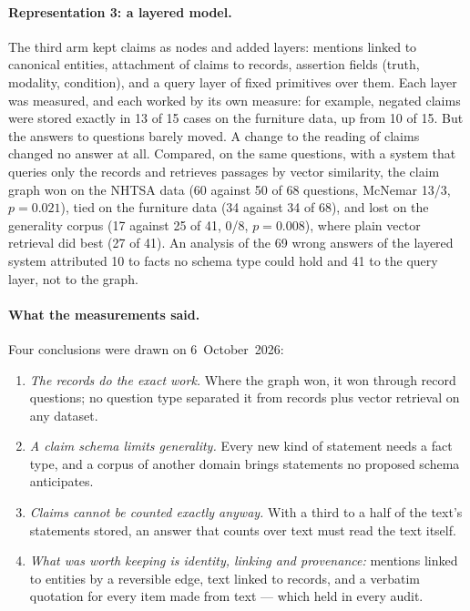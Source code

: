 \paragraph{Representation 3: a layered model.} The third arm kept claims as nodes and added layers: mentions
linked to canonical entities, attachment of claims to records, assertion fields (truth, modality, condition), and
a query layer of fixed primitives over them. Each layer was measured, and each worked by its own measure: for
example, negated claims were stored exactly in 13 of 15 cases on the furniture data, up from 10 of 15. But the
answers to questions barely moved. A change to the reading of claims changed no answer at all. Compared, on the
same questions, with a system that queries only the records and retrieves passages by vector similarity, the claim
graph won on the NHTSA data (60 against 50 of 68 questions, McNemar 13/3, $p = 0.021$), tied on the furniture
data (34 against 34 of 68), and lost on the generality corpus (17 against 25 of 41, 0/8, $p = 0.008$), where plain
vector retrieval did best (27 of 41). An analysis of the 69 wrong answers of the layered system attributed 10 to
facts no schema type could hold and 41 to the query layer, not to the graph.

\paragraph{What the measurements said.} Four conclusions were drawn on 6~October~2026:
\begin{enumerate}[nosep]
\item \emph{The records do the exact work.} Where the graph won, it won through record questions; no question
type separated it from records plus vector retrieval on any dataset.
\item \emph{A claim schema limits generality.} Every new kind of statement needs a fact type, and a corpus of
another domain brings statements no proposed schema anticipates.
\item \emph{Claims cannot be counted exactly anyway.} With a third to a half of the text's statements stored, an
answer that counts over text must read the text itself.
\item \emph{What was worth keeping is identity, linking and provenance:} mentions linked to entities by a
reversible edge, text linked to records, and a verbatim quotation for every item made from text --- which held
in every audit.
\end{enumerate}

